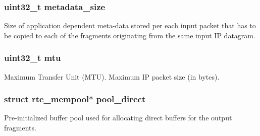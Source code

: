 \subsubsection[{metadata\+\_\+size}]{\setlength{\rightskip}{0pt plus 5cm}uint32\+\_\+t metadata\+\_\+size}\label{structrte__port__ring__reader__ipv4__frag__params_a53192c5a67e697e614b21c797286d09f}
Size of application dependent meta-\/data stored per each input packet that has to be copied to each of the fragments originating from the same input I\+P datagram. \hypertarget{structrte__port__ring__reader__ipv4__frag__params_a3c8ee4e9dd2a5354e83fb30c95598f30}{}
\subsubsection[{mtu}]{\setlength{\rightskip}{0pt plus 5cm}uint32\+\_\+t mtu}\label{structrte__port__ring__reader__ipv4__frag__params_a3c8ee4e9dd2a5354e83fb30c95598f30}
Maximum Transfer Unit (M\+T\+U). Maximum I\+P packet size (in bytes). \hypertarget{structrte__port__ring__reader__ipv4__frag__params_a95aad9924ff3562b4315bb978e4d1ae3}{}
\subsubsection[{pool\+\_\+direct}]{\setlength{\rightskip}{0pt plus 5cm}struct {\bf rte\+\_\+mempool}$\ast$ pool\+\_\+direct}\label{structrte__port__ring__reader__ipv4__frag__params_a95aad9924ff3562b4315bb978e4d1ae3}
Pre-\/initialized buffer pool used for allocating direct buffers for the output fragments. \hypertarget{structrte__port__ring__reader__ipv4__frag__params_a0f5522304362b53153955b2712d7b392}{}
